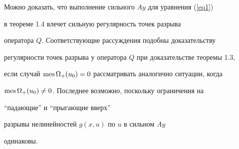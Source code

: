 \begin{notenonum}


Можно доказать, что выполнение сильного $Ay$ для уравнения (\ref{eq1})


в теореме 1.4 влечет сильную регулярность точек разрыва


оператора $Q$. Соответствующие рассуждения подобны доказательству


регулярности точек разрыва у оператора $Q$ при доказательстве теоремы 1.3,


если случай $\operatorname{mes}\Omega_{+}(u_0)=0$ рассматривать аналогично ситуации, когда


$\operatorname{mes}\Omega_{+}(u_0)\ne0$. Последнее возможно, поскольку ограничения на


``падающие'' и ``прыгающие вверх''


разрывы нелинейностей $g(x,u)$ по $u$ в сильном $Ay$


одинаковы.


\end{notenonum}





